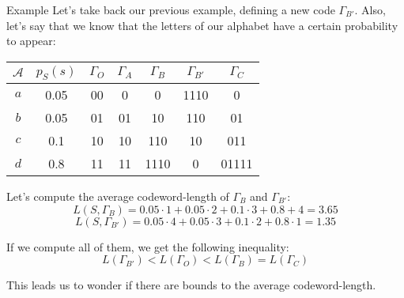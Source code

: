 \documentclass[a4paper]{article}
\begin{document}
\begin{parag}{Example}
   Let's take back our previous example, defining a new code $\Gamma_{B'}$. Also, let's say that we know that the letters of our alphabet have a certain probability to appear:
    \begin{center}
    \begin{tabular}{c|c|ccccc}
        $\mathcal{A}$ & $p_S\left(s\right)$ & $\Gamma_O$ & $\Gamma_A$ & $\Gamma_B$ & $\Gamma_{B'}$ & $\Gamma_C$  \\
        \hline
        $a$ & 0.05 & 00 & 0 & 0 & 1110 & 0 \\
        $b$ & 0.05 & 01 & 01 & 10 & 110 & 01 \\
        $c$ & 0.1  & 10 & 10 & 110 & 10 & 011 \\
        $d$ & 0.8  & 11 & 11 & 1110 & 0 & 01111
    \end{tabular}
    \end{center}

    Let's compute the average codeword-length of $\Gamma_B$ and $\Gamma_{B'}$:
    \[L\left(S, \Gamma_B\right) = 0.05\cdot 1 + 0.05\cdot 2 + 0.1\cdot 3 + 0.8+4 = 3.65\]
    \[L\left(S, \Gamma_{B'}\right) = 0.05\cdot 4 + 0.05\cdot 3 + 0.1\cdot 2 + 0.8\cdot 1 = 1.35\]

    If we compute all of them, we get the following inequality: 
    \[L\left(\Gamma_{B'}\right) < L\left(\Gamma_O\right) < L\left(\Gamma_B\right) = L\left(\Gamma_C\right)\]
    
    This leads us to wonder if there are bounds to the average codeword-length.
\end{parag}
\end{document}
